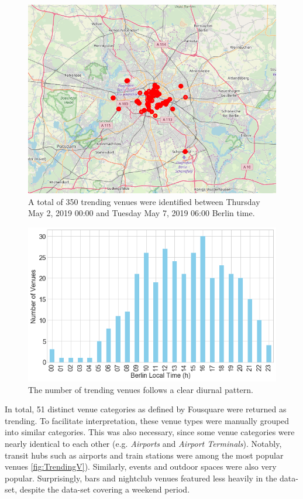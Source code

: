 \documentclass[letter]{scrartcl}
\begin{document}
\begin{figure}[h!]
\centering
\includegraphics[width=12cm]{../Figures/TrendingMap.PNG}
\caption{A total of 350 trending venues were identified between Thursday May 2, 2019 00:00 and Tuesday May 7, 2019 06:00 Berlin time.}\label{fig:TrendingM}
\end{figure}

\clearpage

\begin{figure}[h!]
\centering
\includegraphics[width=12cm]{../Figures/TrendingTimeB.PNG}
\caption{The number of trending venues follows a clear diurnal pattern.}
\label{fig:TrendingT}
\end{figure}

In total, 51 distinct venue categories as defined by Fousquare were returned as trending. To facilitate interpretation, these venue types were manually grouped into similar categories. This was also necessary, since some venue categories were nearly identical to each other (e.g. \emph{Airports} and \emph{Airport Terminals}). Notably, transit hubs such as airports and train stations were among the most popular venues \ref{fig:TrendingV}). Similarly, events and outdoor spaces were also very popular. Surprisingly, bars and nightclub venues featured less heavily in the data-set, despite the data-set covering a weekend period. 
\end{document}
